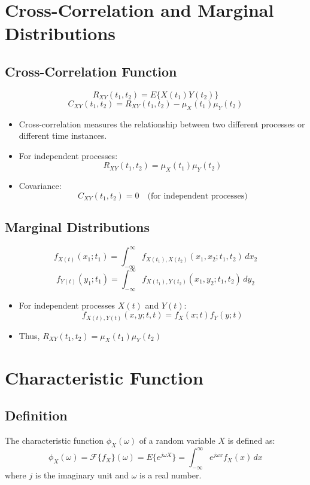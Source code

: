 \documentclass[12pt]{article}
\begin{document}
\section{Cross-Correlation and Marginal Distributions}
\subsection{Cross-Correlation Function}
\[
R_{XY}(t_1, t_2) = E\{X(t_1) Y(t_2)\}
\]
\[
C_{XY}(t_1, t_2) = R_{XY}(t_1, t_2) - \mu_X(t_1) \mu_Y(t_2)
\]
\begin{itemize}
    \item Cross-correlation measures the relationship between two different processes or different time instances.
    \item For independent processes:
    \[
    R_{XY}(t_1, t_2) = \mu_X(t_1) \mu_Y(t_2)
    \]
    \item Covariance:
    \[
    C_{XY}(t_1, t_2) = 0 \quad \text{(for independent processes)}
    \]
\end{itemize}

\subsection{Marginal Distributions}
\[
f_{X(t)}(x_1; t_1) = \int_{-\infty}^{\infty} f_{X(t_1), X(t_2)}(x_1, x_2; t_1, t_2) \, dx_2
\]
\[
f_{Y(t)}(y_1; t_1) = \int_{-\infty}^{\infty} f_{X(t_1), Y(t_2)}(x_1, y_2; t_1, t_2) \, dy_2
\]
\begin{itemize}
    \item For independent processes \( X(t) \) and \( Y(t) \):
    \[
    f_{X(t), Y(t)}(x, y; t, t) = f_X(x; t) f_Y(y; t)
    \]
    \item Thus, \( R_{XY}(t_1, t_2) = \mu_X(t_1) \mu_Y(t_2) \)
\end{itemize}

\section{Characteristic Function}
\subsection{Definition}
The characteristic function \( \phi_X(\omega) \) of a random variable \( X \) is defined as:
\[
\phi_X(\omega) = \mathcal{F}\{f_X\}(\omega) = E\{e^{j\omega X}\} = \int_{-\infty}^{\infty} e^{j\omega x} f_X(x) \, dx
\]
where \( j \) is the imaginary unit and \( \omega \) is a real number.
\end{document}

